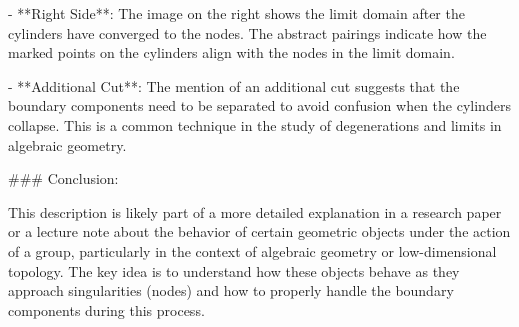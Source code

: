 - **Right Side**: The image on the right shows the limit domain after the cylinders have converged to the nodes. The abstract pairings indicate how the marked points on the cylinders align with the nodes in the limit domain.

- **Additional Cut**: The mention of an additional cut suggests that the boundary components need to be separated to avoid confusion when the cylinders collapse. This is a common technique in the study of degenerations and limits in algebraic geometry.

### Conclusion:

This description is likely part of a more detailed explanation in a research paper or a lecture note about the behavior of certain geometric objects under the action of a group, particularly in the context of algebraic geometry or low-dimensional topology. The key idea is to understand how these objects behave as they approach singularities (nodes) and how to properly handle the boundary components during this process.